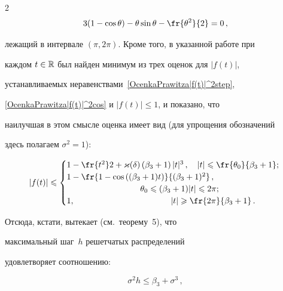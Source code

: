 \begin{multicols}{2}
$$

3(1-\cos\theta)-\theta\sin\theta-\fr{\theta^2}{2}=0\,,

$$

лежащий в интервале $(\pi,2\pi)$. Кроме того, в указанной работе при

каждом $t\in\mathbb R$ был найден минимум из трех оценок для $|f(t)|$,

устанавливаемых неравенствами~\eqref{OcenkaPrawitza|f(t)|^2step},

\eqref{OcenkaPrawitza|f(t)|^2cos} и $|f(t)|\le1$, и показано, что

наилучшая в этом смысле оценка имеет вид (для упрощения обозначений

здесь полагаем $\sigma^2=1$):

$$

|f(t)|\le

\begin{cases}

1-\fr{t^2}2+\varkappa(\d)\left(\beta_3+

 1\right)|t|^3\,,\hspace*{10pt}   |t|\le\fr{\theta_0}{\beta_3+1};\hspace*{-8pt} \\

1-\fr{1-\cos\left((\beta_3+1) t\right)}

 {(\beta_3+1)^2}\, , \\

\hspace*{88pt} \theta_0\le (\beta_3+1)|t|  \le 2\pi;\hspace*{-8pt} \\

    1, \hspace*{115pt} |t|\ge\fr{2\pi}{\beta_3+1}\,.\hspace*{-8pt}

\end{cases}

$$

Отсюда, кстати, вытекает  (см.\ теорему~5), что

максимальный шаг~$h$ решетчатых распределений

удов\-ле\-тво\-ря\-ет соотношению:

\begin{equation}

\label{PrawitzUtochnilMisesa}

\sigma^2h\le \beta_3+\sigma^3\,,

\end{equation}


\end{multicols}
